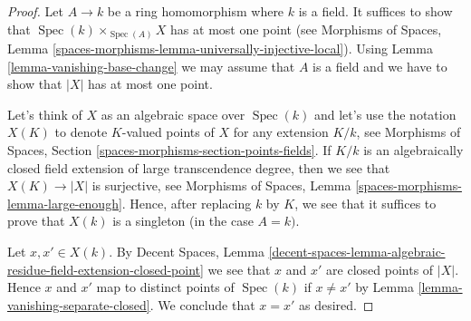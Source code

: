 \documentclass[10pt,a4paper]{amsart}
\theoremstyle{plain}
\theoremstyle{definition}
\theoremstyle{remark}
\numberwithin{equation}{subsection}
\def\Spec{\mathop{\mathrm{Spec}}}
\begin{document}
\begin{proof}
Let $A \to k$ be a ring homomorphism where $k$ is a field. It suffices to
show that $\Spec(k) \times_{\Spec(A)} X$ has at most one point (see
Morphisms of Spaces, Lemma
\ref{spaces-morphisms-lemma-universally-injective-local}).
Using Lemma \ref{lemma-vanishing-base-change} we may assume that $A$
is a field and we have to show that $|X|$ has at most one point.

\medskip\noindent
Let's think of $X$ as an algebraic space over $\Spec(k)$ and let's
use the notation $X(K)$ to denote $K$-valued points of $X$
for any extension $K/k$, see
Morphisms of Spaces, Section \ref{spaces-morphisms-section-points-fields}.
If $K/k$ is an algebraically closed field extension
of large transcendence degree, then we see that $X(K) \to |X|$
is surjective, see Morphisms of Spaces, Lemma
\ref{spaces-morphisms-lemma-large-enough}. Hence, after replacing $k$
by $K$, we see that it suffices to prove that $X(k)$ is a singleton
(in the case $A = k)$.

\medskip\noindent
Let $x, x' \in X(k)$. By Decent Spaces, Lemma
\ref{decent-spaces-lemma-algebraic-residue-field-extension-closed-point}
we see that $x$ and $x'$ are closed points of $|X|$. Hence $x$ and $x'$
map to distinct points of $\Spec(k)$ if $x \not = x'$ by
Lemma \ref{lemma-vanishing-separate-closed}. We conclude that
$x = x'$ as desired.
\end{proof}
\end{document}
